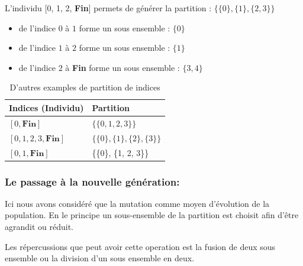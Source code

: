 \documentclass[runningheads]{llncs}
\begin{document}
L'individu [0, 1, 2, \textbf{Fin}] permets de générer la partition :  $\{\{0\}, \{1\}, \{2, 3\}\}$
\begin{itemize}
    \item de l'indice $0$ \`a $1$ forme un sous ensemble : $\{0\}$
    \item de l'indice $1$ \`a $2$ forme un sous ensemble : $\{1\}$
    \item de l'indice $2$ \`a \textbf{Fin} forme un sous ensemble : $\{3, 4\}$
\end{itemize}
\begin{table}[H]
\centering
\caption{D'autres examples de partition de indices}\label{tab1}
\begin{tabular}{|l|l|}
\hline
Indices (Individu) &  Partition \\
\hline
$[0, \textbf{Fin}]$&  $\{\{0, 1, 2, 3\}\}$\\
$[0,1, 2, 3, \textbf{Fin}]$ & $\{\{0\}, \{1\}, \{2\}, \{3\}\}$\\
$[0,1, \textbf{Fin}]$ & \{\{0\}, \{1, 2, 3\}\}\\
\hline
\end{tabular}
\end{table}

\subsubsection{Le passage à la nouvelle génération:}
Ici nous avons considéré que la mutation comme moyen 
d'\'evolution de la population. En le principe un sous-ensemble de la partition 
est choisit afin d'\^etre agrandit ou  réduit.

Les répercussions que peut avoir cette operation est la fusion de 
deux sous ensemble ou la division d'un sous ensemble en deux.
\end{document}
